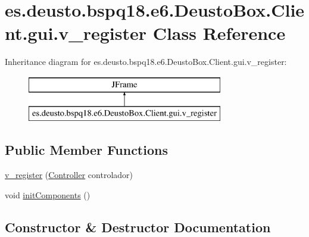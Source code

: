 \hypertarget{classes_1_1deusto_1_1bspq18_1_1e6_1_1_deusto_box_1_1_client_1_1gui_1_1v__register}{}\section{es.\+deusto.\+bspq18.\+e6.\+Deusto\+Box.\+Client.\+gui.\+v\+\_\+register Class Reference}
\label{classes_1_1deusto_1_1bspq18_1_1e6_1_1_deusto_box_1_1_client_1_1gui_1_1v__register}
Inheritance diagram for es.\+deusto.\+bspq18.\+e6.\+Deusto\+Box.\+Client.\+gui.\+v\+\_\+register\+:\begin{figure}[H]
\begin{center}
\leavevmode
\includegraphics[height=2.000000cm]{classes_1_1deusto_1_1bspq18_1_1e6_1_1_deusto_box_1_1_client_1_1gui_1_1v__register}
\end{center}
\end{figure}
\subsection*{Public Member Functions}
\begin{DoxyCompactItemize}
\item 
\mbox{\hyperlink{classes_1_1deusto_1_1bspq18_1_1e6_1_1_deusto_box_1_1_client_1_1gui_1_1v__register_af538bac94a2c50a3a8ad28e5c959c966}{v\+\_\+register}} (\mbox{\hyperlink{classes_1_1deusto_1_1bspq18_1_1e6_1_1_deusto_box_1_1_client_1_1controller_1_1_controller}{Controller}} controlador)
\item 
void \mbox{\hyperlink{classes_1_1deusto_1_1bspq18_1_1e6_1_1_deusto_box_1_1_client_1_1gui_1_1v__register_adb568ac6c8d54fc3466930889615af8c}{init\+Components}} ()
\end{DoxyCompactItemize}


\subsection{Constructor \& Destructor Documentation}
\mbox{\label{classes_1_1deusto_1_1bspq18_1_1e6_1_1_deusto_box_1_1_client_1_1gui_1_1v__register_af538bac94a2c50a3a8ad28e5c959c966}} 
